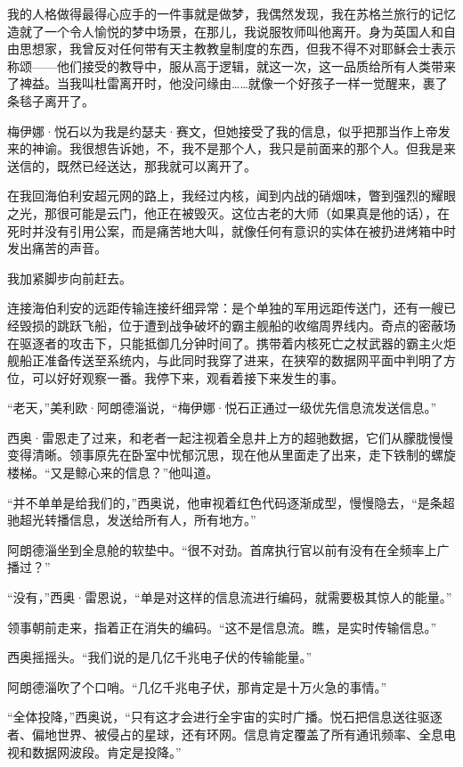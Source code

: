 \documentclass[AutoFakeBold=true]{book}
\begin{document}
{我的人格做得最得心应手的一件事就是做梦，我偶然发现，我在苏格兰旅行的记忆造就了一个令人愉悦的梦中场景，在那儿，我说服牧师叫他离开。身为英国人和自由思想家，我曾反对任何带有天主教教皇制度的东西，但我不得不对耶稣会士表示称颂——他们接受的教导中，服从高于逻辑，就这一次，这一品质给所有人类带来了裨益。当我叫杜雷离开时，他没问缘由……就像一个好孩子一样一觉醒来，裹了条毯子离开了。

梅伊娜·悦石以为我是约瑟夫·赛文，但她接受了我的信息，似乎把那当作上帝发来的神谕。我很想告诉她，不，我不是那个人，我只是前面来的那个人。但我是来送信的，既然已经送达，那我就可以离开了。

在我回海伯利安超元网的路上，我经过内核，闻到内战的硝烟味，瞥到强烈的耀眼之光，那很可能是云门，他正在被毁灭。这位古老的大师（如果真是他的话），在死时并没有引用公案，而是痛苦地大叫，就像任何有意识的实体在被扔进烤箱中时发出痛苦的声音。

我加紧脚步向前赶去。

连接海伯利安的远距传输连接纤细异常：是个单独的军用远距传送门，还有一艘已经毁损的跳跃飞船，位于遭到战争破坏的霸主舰船的收缩周界线内。奇点的密蔽场在驱逐者的攻击下，只能抵御几分钟时间了。携带着内核死亡之杖武器的霸主火炬舰船正准备传送至系统内，与此同时我穿了进来，在狭窄的数据网平面中判明了方位，可以好好观察一番。我停下来，观看着接下来发生的事。}

\vspace*{1em}

``老天，''美利欧·阿朗德淄说，``梅伊娜·悦石正通过一级优先信息流发送信息。''

西奥·雷恩走了过来，和老者一起注视着全息井上方的超驰数据，它们从朦胧慢慢变得清晰。领事原先在卧室中忧郁沉思，现在他从里面走了出来，走下铁制的螺旋楼梯。``又是鲸心来的信息？''他叫道。

``并不单单是给我们的，''西奥说，他审视着红色代码逐渐成型，慢慢隐去，``是条超驰超光转播信息，发送给所有人，所有地方。''

阿朗德淄坐到全息舱的软垫中。``很不对劲。首席执行官以前有没有在全频率上广播过？''

``没有，''西奥·雷恩说，``单是对这样的信息流进行编码，就需要极其惊人的能量。''

领事朝前走来，指着正在消失的编码。``这不是信息流。瞧，是实时传输信息。''

西奥摇摇头。``我们说的是几亿千兆电子伏的传输能量。''

阿朗德淄吹了个口哨。``几亿千兆电子伏，那肯定是十万火急的事情。''

``全体投降，''西奥说，``只有这才会进行全宇宙的实时广播。悦石把信息送往驱逐者、偏地世界、被侵占的星球，还有环网。信息肯定覆盖了所有通讯频率、全息电视和数据网波段。肯定是投降。''
\end{document}
